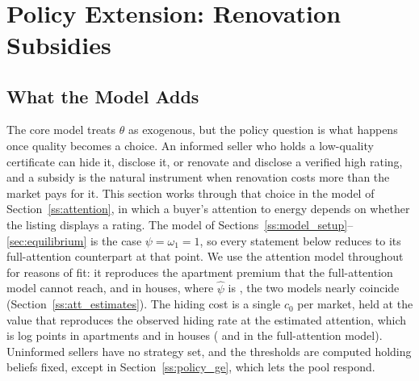 \documentclass[10pt,letterpaper]{bp-template-concise}
\begin{document}
\vspace{1em}
 \\
\vspace{0.2em}











\section{Policy Extension: Renovation Subsidies}
\label{sec:policy}

\subsection{What the Model Adds}
\label{ss:policy_scope}

The core model treats $\theta$ as exogenous, but the policy question is what happens once quality becomes a choice. An informed seller who holds a low-quality certificate can hide it, disclose it, or renovate and disclose a verified high rating, and a subsidy is the natural instrument when renovation costs more than the market pays for it. This section works through that choice in the model of Section~\ref{ss:attention}, in which a buyer's attention to energy depends on whether the listing displays a rating. The model of Sections~\ref{ss:model_setup}--\ref{sec:equilibrium} is the case $\psi=\omega_1=1$, so every statement below reduces to its full-attention counterpart at that point. We use the attention model throughout for reasons of fit: it reproduces the apartment premium that the full-attention model cannot reach, and in houses, where $\hat\psi$ is \attPsiHouse{}, the two models nearly coincide (Section~\ref{ss:att_estimates}). The hiding cost is a single $c_0$ per market, held at the value that reproduces the observed hiding rate at the estimated attention, which is \attCzeroFitApt{} log points in apartments and \attCzeroFitHouse{} in houses (\attCzeroCoreMeanApt{} and \attCzeroCoreMeanHouse{} in the full-attention model). Uninformed sellers have no strategy set, and the thresholds are computed holding beliefs fixed, except in Section~\ref{ss:policy_ge}, which lets the pool respond.
\end{document}
